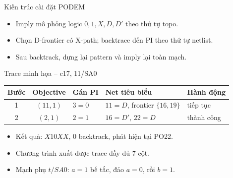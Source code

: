 \begin{frame}{Kiến trúc cài đặt PODEM}

\centering
\small
{}

\vspace{2mm}
\begin{itemize}
    \item Imply mô phỏng logic $0,1,X,D,D'$ theo thứ tự topo.
    \item Chọn D-frontier có X-path; backtrace đến PI theo thứ tự netlist.
    \item Sau backtrack, dựng lại pattern và imply lại toàn mạch.
\end{itemize}

\end{frame}


\begin{frame}{Trace minh họa -- c17, 11/SA0}

\centering
\begin{tabular}{cclll}
\hline
Bước & Objective & Gán PI & Net tiêu biểu & Hành động\\
\hline
1 & $(11,1)$ & $3=0$ & $11=D$, frontier $\{16,19\}$ & tiếp tục\\
2 & $(2,1)$ & $2=1$ & $16=D'$, $22=D$ & thành công\\
\hline
\end{tabular}

\vspace{3mm}
\begin{itemize}
    \item Kết quả: $X10XX$, 0 backtrack, phát hiện tại PO22.
    \item Chương trình xuất được trace đầy đủ 7 cột.
    \item Mạch phụ $t/SA0$: $a=1$ bế tắc, đảo $a=0$, rồi $b=1$.
\end{itemize}

\end{frame}



